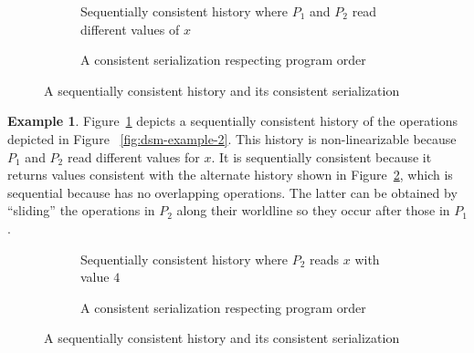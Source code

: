 \documentclass[]             %
{NASA}                       %
\theoremstyle{definition}
\newtheorem{example}[theorem]{Example}
\begin{document}
\begin{figure}
  \begin{subfigure}{1\textwidth}
    \setlength\belowcaptionskip{4ex}
    \centering
    
    \caption{Sequentially consistent history where $P_1$ and $P_2$ read different values of $x$}
    \label{fig:dsm-example-2-sequential-1-sub}
  \end{subfigure}
  \begin{subfigure}{1\textwidth}
    
    \caption{A consistent serialization respecting program order}
    \label{fig:dsm-example-2-sequential-1-serial}
  \end{subfigure}
  \caption{A sequentially consistent history and its consistent serialization}
  \label{fig:dsm-example-2-sequential-1}
\end{figure}

\begin{example}
  \label{ex:dsm-example-2-sequential-1}
  Figure~\ref{fig:dsm-example-2-sequential-1-sub} depicts a sequentially
  consistent history of the operations depicted in Figure
 ~\ref{fig:dsm-example-2}. This history is non-linearizable because
  $P_1$ and $P_2$ read different values for $x$. It is sequentially
  consistent because it returns values consistent with the alternate
  history shown in Figure~\ref{fig:dsm-example-2-sequential-1-serial},
  which is sequential because has no overlapping operations. The
  latter can be obtained by ``sliding'' the operations in $P_2$ along
  their worldline so they occur after those in $P_1$.
\end{example}

\begin{figure}
  \begin{subfigure}{1\textwidth}
    \setlength\belowcaptionskip{4ex}
    \centering
    
    \caption{Sequentially consistent history where $P_2$ reads $x$ with value $4$}
    \label{fig:dsm-example-2-sequential-2-sub}
  \end{subfigure}
  \begin{subfigure}{1\textwidth}
    
    \caption{A consistent serialization respecting program order}
    \label{fig:dsm-example-2-sequential-2-serial}
  \end{subfigure}
  \caption{A sequentially consistent history and its consistent serialization}
  \label{fig:dsm-example-2-sequential-2}
\end{figure}
\end{document}
